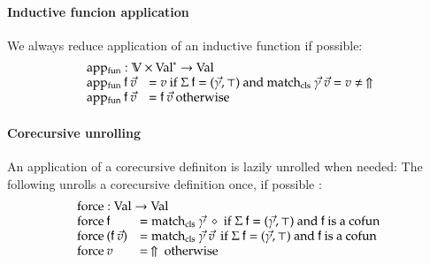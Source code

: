 \paragraph*{Inductive funcion application}
We always reduce application of an inductive function if possible:\[
\begin{array}{ll}
\multicolumn{2}{l}{\apf : \cV \times \ves{\Val} \ra \Val}\\
\apf \: \ff \: \vec{v} & = v \mbox{ if } \Sig \: \ff = (\vec{\gamma},\top) \mbox { and } \matchcls \: \vec{\gamma} \: \vec{v} = v \neq \stuck \\ 
\apf \: \ff \: \vec{v} & = \ff \: \vec{v} \mbox { otherwise } 
\end{array}
\]


\paragraph*{Corecursive unrolling}
An application of a corecursive definiton is lazily unrolled when needed: 
The following unrolls a corecursive definition once, if possible :
\[
\begin{array}{ll}
\multicolumn{2}{l}{\forc : \Val \ra \Val }\\
\forc \: \ff & = \matchcls \: \vec{\gamma} \: \diamond \mbox{ if } \Sig \: \ff = (\vec{\gamma},\top) \mbox{ and } \ff \mbox { is a } \cofun \\
\forc \: (\ff \: \vec{v}) & = \matchcls \: \vec{\gamma} \: \vec{v} \: \mbox{ if } \Sig \: \ff = (\vec{\gamma},\top) \mbox { and } \ff \mbox { is a } \cofun\\ 
\forc \: v & = \stuck \mbox{ otherwise}
\end{array}
\]


